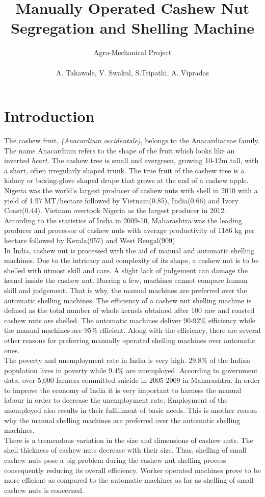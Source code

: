 \documentclass [12pt] {report}
\title{\textbf{Manually Operated Cashew Nut Segregation and Shelling Machine}}
\author{Agro-Mechanical Project\\\\A. Takawale, V. Swakul, S.Tripathi, A. Vipradas}
\begin{document}
\maketitle
\tableofcontents
\listoffigures
\listoftables

\chapter{Introduction}
The cashew fruit, \textit{(Anacardium occidentale)}, belongs to the Anacardiaceae family. The name Anacardium refers to the shape of the fruit which looks like an inverted \textit{heart}. The cashew tree is small and evergreen, growing 10-12m tall, with a short, often irregularly shaped trunk. The true fruit of the cashew tree is a kidney or boxing-glove shaped drupe that grows at the end of a cashew apple.\\Nigeria was the world's largest producer of cashew nuts with shell in 2010 with a yield of 1.97 MT/hectare followed by Vietnam(0.85), India(0.66) and Ivory Coast(0.44). Vietnam overtook Nigeria as the largest producer in 2012.\\According to the statistics of India in 2009-10, Maharashtra was the leading producer and processor of cashew nuts with average productivity of 1186 kg per hectare followed by Kerala(957) and West Bengal(909).\\In India, cashew nut is processed with the aid of manual and automatic shelling machines. Due to the intricacy and complexity of its shape, a cashew nut is to be shelled with utmost skill and care. A slight lack of judgement can damage the kernel inside the cashew nut. Barring a few, machines cannot compare human skill and judgement. That is why, the manual machines are preferred over the automatic shelling machines. The efficiency of a cashew nut shelling machine is defined as the total number of whole kernels obtained after 100 raw and roasted cashew nuts are shelled. The automatic machines deliver 90-92\% efficiency while the manual machines are 95\% efficient. Along with the efficiency, there are several other reasons for preferring manually operated shelling machines over automatic ones.\\The poverty and unemployment rate in India is very high. 29.8\% of the Indian population lives in poverty while 9.4\% are unemployed. According to government data, over 5,000 farmers committed suicide in 2005-2009 in Maharashtra. In order to improve the economy of India it is very important to harness the manual labour in order to decrease the unemployment rate. Employment of the unemployed also results in their fulfillment of basic needs. This is another reason why the manual shelling machines are preferred over the automatic shelling machines.\\There is a tremendous variation in the size and dimensions of cashew nuts. The shell thickness of cashew nuts decrease with their size. Thus, shelling of small cashew nuts pose a big problem during the cashew nut shelling process consequently reducing its overall efficiency. Worker operated machines prove to be more efficient as compared to the automatic machines as far as shelling of small cashew nuts is concerned. 
\end{document}
